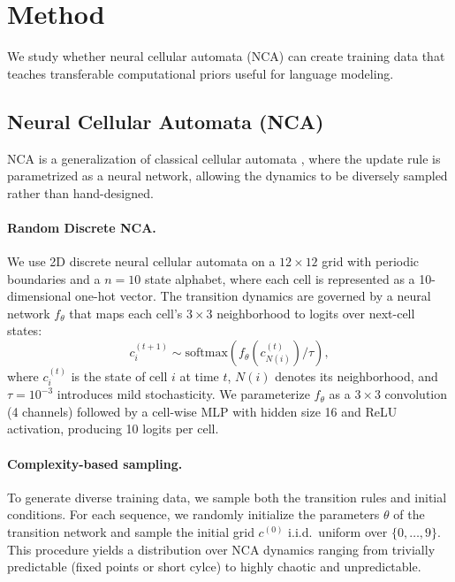 \documentclass{article}
\theoremstyle{plain}
\theoremstyle{definition}
\theoremstyle{remark}
\begin{document}
\section{Method}
\label{sec:method}
We study whether neural cellular automata (NCA) can create training data that teaches transferable computational priors useful for language modeling.

\subsection{Neural Cellular Automata (NCA)}
\label{subsec:nca}

NCA is a generalization of classical cellular automata \citep{WOLFRAM19841}, where the update rule is parametrized as a neural network, allowing the dynamics to be diversely sampled rather than hand-designed.

\paragraph{Random Discrete NCA.}
We use 2D discrete neural cellular automata on a $12{\times}12$ grid with periodic boundaries and a $n=10$ state alphabet, where each cell is represented as a 10-dimensional one-hot vector. The transition dynamics are governed by a neural network $f_\theta$ that maps each cell's $3{\times}3$ neighborhood to logits over next-cell states:
\begin{equation}
c^{(t+1)}_{i} \sim \mathrm{softmax}\!\left(f_\theta\!\left(c^{(t)}_{N(i)}\right) / \tau\right),
\end{equation}
where $c_i^{(t)}$ is the state of cell $i$ at time $t$, $N(i)$ denotes its neighborhood, and $\tau=10^{-3}$ introduces mild stochasticity. We parameterize $f_\theta$ as a $3{\times}3$ convolution (4 channels) followed by a cell-wise MLP with hidden size 16 and ReLU activation, producing 10 logits per cell.

\paragraph{Complexity-based sampling.}
To generate diverse training data, we sample both the transition rules and initial conditions. For each sequence, we randomly initialize the parameters $\theta$ of the transition network and sample the initial grid $c^{(0)}$ i.i.d.\ uniform over $\{0,\dots,9\}$. This procedure yields a distribution over NCA dynamics ranging from trivially predictable (fixed points or short cylce) to highly chaotic and unpredictable.
\end{document}
